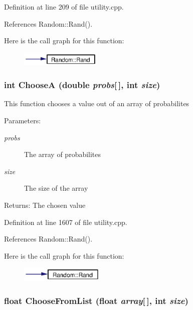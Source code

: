 Definition at line 209 of file utility.cpp.

References Random::Rand().

Here is the call graph for this function:\begin{figure}[H]
\begin{center}
\leavevmode
\includegraphics[width=109pt]{utility_8h_a6_cgraph}
\end{center}
\end{figure}
\subsubsection{\setlength{\rightskip}{0pt plus 5cm}int Choose\-A (double {\em probs}[$\,$], int {\em size})}\label{utility_8h_a39}


This function chooses a value out of an array of probabilites \begin{Desc}
\item[Parameters:]
\begin{description}
\item[{\em probs}]The array of probabilites \item[{\em size}]The size of the array \end{description}
\end{Desc}
\begin{Desc}
\item[Returns:]The chosen value \end{Desc}


Definition at line 1607 of file utility.cpp.

References Random::Rand().

Here is the call graph for this function:\begin{figure}[H]
\begin{center}
\leavevmode
\includegraphics[width=113pt]{utility_8h_a39_cgraph}
\end{center}
\end{figure}
\subsubsection{\setlength{\rightskip}{0pt plus 5cm}float Choose\-From\-List (float {\em array}[$\,$], int {\em size})}\label{utility_8h_a40}


